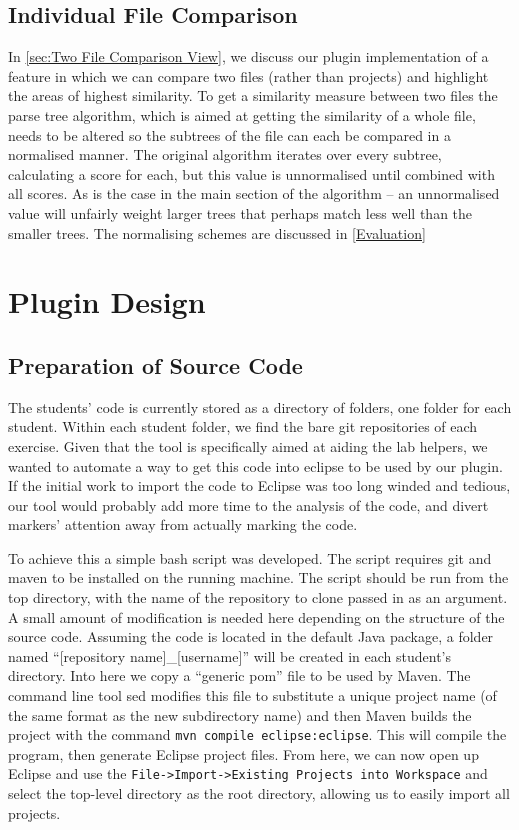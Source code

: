 \section{Individual File Comparison}

In \cref{sec:Two File Comparison View}, we discuss our plugin implementation
of a feature in which we can compare two files (rather than projects) and highlight
the areas of highest similarity. To get a similarity measure between two files
the parse tree algorithm, which is aimed at getting the similarity of a whole
file, needs to be altered so the subtrees of the file can each be compared in a 
normalised manner. The original algorithm iterates over every subtree, calculating
a score for each, but this value is unnormalised until combined with all scores.
As is the case in the main section of the algorithm -- an unnormalised value
will unfairly weight larger trees that perhaps match less well than the
smaller trees. The normalising schemes are discussed in \ref{Evaluation}

\chapter{Plugin Design}

\section{Preparation of Source Code}

The students' code is currently stored as a directory of folders, one folder for
each student. Within each student folder, we find the bare git repositories of 
each exercise. Given that the tool is specifically aimed at aiding the lab helpers,
we wanted to automate a way to get this code into eclipse to be used by our plugin.
If the initial work to import the code to Eclipse was too long winded and tedious,
our tool would probably add more time to the analysis of the code, and divert markers'
attention away from actually marking the code.

To achieve this a simple bash script was developed. The script requires git and
maven to be installed on the running machine. The script should be run from the
top directory, with the name of the repository to clone passed in as an argument.
A small amount of modification is needed here depending on the structure of the
source code. Assuming the code is located in the default Java package, a folder
named ``[repository name]\_[username]'' will be created in each student's directory.
Into here we copy a ``generic pom'' file to be used by Maven. The command line tool
sed modifies this file to substitute a unique project name (of the same format as
the new subdirectory name) and then Maven builds the project with the command 
\texttt{mvn compile eclipse:eclipse}. This will compile the program, then generate
Eclipse project files. From here, we can now open up Eclipse and use the 
\texttt{File->Import->Existing Projects into Workspace} and select the top-level
directory as the root directory, allowing us to easily import all projects.

